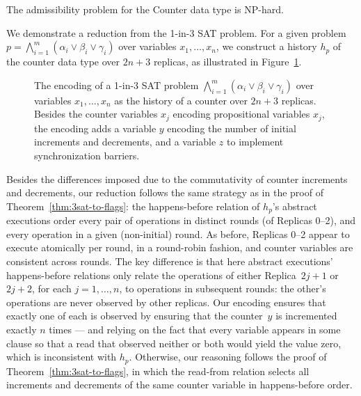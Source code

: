 \vspace{-1mm}
\begin{theorem}
  \label{thm:3sat-to-counter}

  The admissibility problem for the Counter data type is NP-hard.

\vspace{-1mm}
\end{theorem}

We demonstrate a reduction from the 1-in-3 SAT problem. For a given problem $p = \bigwedge_{i=1}^{m} (\alpha_i \lor \beta_i \lor \gamma_i)$ over variables $x_1, \ldots, x_n$, we construct a history $h_p$ of the counter data type over $2n+3$ replicas, as illustrated in Figure~\ref{fig:3sat-to-counter}.

    \begin{figure}[t]
      \centering
      {\scriptsize}
     \vspace{-1mm}
      \caption{The encoding of a 1-in-3 SAT problem $\bigwedge_{i=1}^{m} (\alpha_i \lor \beta_i \lor \gamma_i)$ over variables $x_1, \ldots, x_n$ as the history of a counter over $2n+3$ replicas. Besides the counter variables $x_j$ encoding propositional variables $x_j$, the encoding adds a variable $y$ encoding the number of initial increments and decrements, and a variable $z$ to implement synchronization barriers.}
      \label{fig:3sat-to-counter}
     \vspace{-4mm}
    \end{figure}

     Besides the differences imposed due to the commutativity of counter increments and decrements, our reduction follows the same strategy as in the proof of Theorem~\ref{thm:3sat-to-flags}: the happens-before relation of $h_p$’s abstract executions order every pair of operations in distinct rounds (of Replicas 0–2), and every operation in a given (non-initial) round. As before, Replicas 0–2 appear to execute atomically per round, in a round-robin fashion, and counter variables are consistent across rounds. The key difference is that here abstract executions’ happens-before relations only relate the operations of either Replica~$2j\!+\!1$ or $2j\!+\!2$, for each $j = 1, \ldots, n$, to operations in subsequent rounds: the other’s operations are never observed by other replicas. Our encoding ensures that exactly one of each is observed by ensuring that the counter~$y$ is incremented exactly $n$ times — and relying on the fact that every variable appears in some clause so that a read that observed neither or both would yield the value zero, which is inconsistent with $h_p$. Otherwise, our reasoning follows the proof of Theorem~\ref{thm:3sat-to-flags}, in which the read-from relation selects all increments and decrements of the same counter variable in happens-before order.
\vspace{-2mm}

